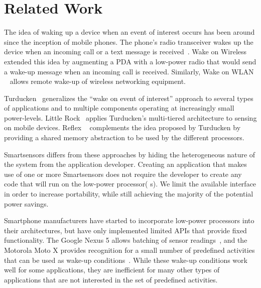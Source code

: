 \section{Related Work}\label{sec:related}

The idea of waking up a device when an event of interest occurs has been 
around since the inception of mobile phones. The phone's radio 
transceiver wakes up the device when an incoming call or a text message 
is received~\cite{gobi}. Wake on Wireless~\cite{shih2002wake} extended this idea by 
augmenting a PDA with a low-power radio that would send a wake-up message 
when an incoming call is received. Similarly, Wake on WLAN
~\cite{mishra2006wake} allows remote wake-up of wireless networking
equipment.

Turducken~\cite{turducken} generalizes the ``wake on event of interest'' 
approach to several types of applications and to multiple components 
operating at increasingly small power-levels. Little Rock~\cite{littlerock} 
applies Turducken's multi-tiered architecture to sensing on mobile 
devices. Reflex ~\cite{reflex} complements the idea proposed by Turducken 
by providing a shared memory abstraction to be used by the different 
processors.

Smartsensors differs from these approaches by hiding the heterogeneous 
nature of the system from the application developer. Creating an 
application that makes use of one or more Smartsensors does not require 
the developer to create any code that will run on the low-power processor(
s). We limit the available interface in order to increase portability, 
while still achieving the majority of the potential power savings.

Smartphone manufacturers have started to incorporate low-power
processors into their architectures, but have only implemented limited
APIs that provide fixed functionality. The Google Nexus 5 allows
batching of sensor readings~\cite{android4.4,nexus5}, and the
Motorola Moto X provides recognition for a small number of predefined
activities that can be used as wake-up conditions~\cite{motox}. While
these wake-up conditions work well for some applications, they are
inefficient for many other types of applications that are not
interested in the set of predefined activities.

